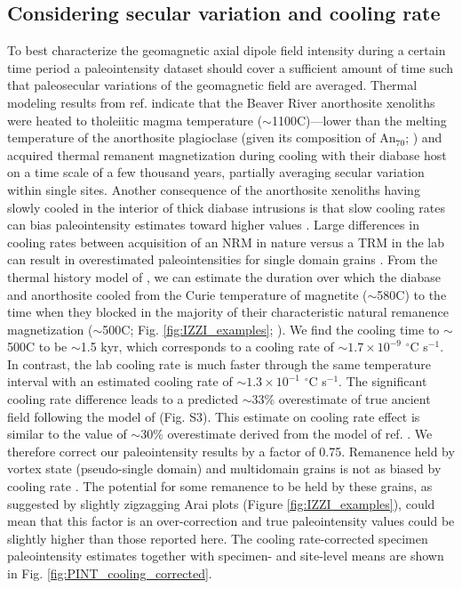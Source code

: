 \documentclass[9pt,twocolumn,twoside,lineno]{pnas-new}
\begin{document}
\subsection*{Considering secular variation and cooling rate}
To best characterize the geomagnetic axial dipole field intensity during a certain time period a paleointensity dataset should cover a sufficient amount of time such that paleosecular variations of the geomagnetic field are averaged. Thermal modeling results from ref. \citealp{Zhang2021b} indicate that the Beaver River anorthosite xenoliths were heated to tholeiitic magma temperature ($\sim$1100\textdegree C)---lower than the melting temperature of the anorthosite plagioclase (given its composition of An$_{70}$; \citealp{Morrison1983a, Doyle2016a}) and acquired thermal remanent magnetization during cooling with their diabase host on a time scale of a few thousand years, partially averaging secular variation within single sites. Another consequence of the anorthosite xenoliths having slowly cooled in the interior of thick diabase intrusions is that slow cooling rates can bias paleointensity estimates toward higher values \cite{Halgedahl1980a}. Large differences in cooling rates between acquisition of an NRM in nature versus a TRM in the lab can result in overestimated paleointensities for single domain grains \cite{Dodson1980a, Halgedahl1980a, Nagy2021a}. From the thermal history model of \cite{Zhang2021b}, we can estimate the duration over which the diabase and anorthosite cooled from the Curie temperature of magnetite ($\sim$580\textdegree C) to the time when they blocked in the majority of their characteristic natural remanence magnetization ($\sim$500\textdegree  C; Fig. \ref{fig:IZZI_examples}; \citealp{Zhang2021b}). We find the cooling time to $\sim$500\textdegree C to be $\sim$1.5 kyr, which corresponds to a cooling rate of $\sim1.7\times10^{-9}$ $^\circ$C s$^{-1}$. In contrast, the lab cooling rate is much faster through the same temperature interval with an estimated cooling rate of $\sim1.3\times10^{-1}$ $^\circ$C s$^{-1}$. The significant cooling rate difference leads to a predicted $\sim$33\% overestimate of true ancient field following the model of \citealp{Halgedahl1980a} (Fig. S3). This estimate on cooling rate effect is similar to the value of $\sim$30\% overestimate derived from the model of ref. \citealp{Nagy2021a}. We therefore correct our paleointensity results by a factor of 0.75. Remanence held by vortex state (pseudo-single domain) and multidomain grains is not as biased by cooling rate \cite{Biggin2013a}. The potential for some remanence to be held by these grains, as suggested by slightly zigzagging Arai plots (Figure \ref{fig:IZZI_examples}), could mean that this factor is an over-correction and true paleointensity values could be slightly higher than those reported here. The cooling rate-corrected specimen paleointensity estimates together with specimen- and site-level means are shown in Fig. \ref{fig:PINT_cooling_corrected}.
\end{document}
